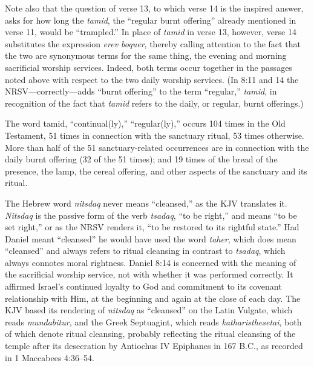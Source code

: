 Note also that the question of verse 13, to which verse 14 is the inspired
answer, asks for how long the \textit{tamid}, the ``regular burnt offering'' already
mentioned in verse 11, would be ``trampled.'' In place of \textit{tamid} in verse 13, 
however, verse 14 substitutes the expression \textit{erev boquer}, thereby calling
attention to the fact that the two are synonymous terms for the same thing,
the evening and morning sacrificial worship services. Indeed, both terms
occur together in the passages noted above with respect to the two daily
worship services. (In 8:11 and 14 the NRSV---correctly---adds
``burnt offering'' to the term ``regular,'' \textit{tamid}, in recognition of the fact
that \textit{tamid} refers to the daily, or regular, burnt offerings.)

The word tamid, ``continual(ly),'' ``regular(ly),'' occurs 104 times in the Old
Testament, 51 times in connection with the sanctuary ritual, 53 times
otherwise. More than half of the 51 sanctuary-related occurrences are in
connection with the daily burnt offering (32 of the 51 times); and 19 times
of the bread of the presence, the lamp, the cereal offering, and other
aspects of the sanctuary and its ritual. 

The Hebrew word \textit{nitsdaq} never means ``cleansed,'' as the KJV translates it.
\textit{Nitsdaq} is the passive form of the verb \textit{tsadaq}, ``to be right,'' and means ``to
be set right,'' or as the NRSV renders it, ``to be restored to its rightful
state.'' Had Daniel meant ``cleansed'' he would have used the word \textit{taher}, which
does mean ``cleansed'' and always refers to ritual cleansing in contrast to
\textit{tsadaq}, which always connotes moral rightness. 
\newpage
Daniel 8:14 is concerned with the meaning of the sacrificial worship
service, not with whether it was performed correctly. It affirmed Israel's
continued loyalty to God and commitment to its covenant relationship with
Him, at the beginning and again at the close of each day. The KJV based its
rendering of \textit{nitsdaq} as ``cleansed'' on the Latin Vulgate, which reads
\textit{mundabitur}, and the Greek Septuagint, which reads \textit{katharisthesetai}, both of
which denote ritual cleansing, probably reflecting the ritual cleansing of
the temple after its desecration by Antiochus IV Epiphanes in 167 B.C., as
recorded in 1 Maccabees 4:36--54.

